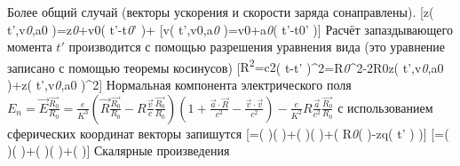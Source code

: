\documentclass[11pt]{article}
\begin{document}
Более общий случай (векторы ускорения и скорости заряда сонаправлены).
{[}z\left( t',{{v}\emph{{0}},{{a}}{0}}
\right)={{z}\emph{{0}}+{{v}}{0}}\left(
t'-{{t}\emph{{0}}'
\right)+\frac{{{a}_{0}}{{\left( t'-{{t}_{0}}' \right)}^{2}}}{2}{]}
{[}v\left( t',{{v}}{0}},{{a}\emph{{0}}
\right)={{v}}{0}}+{{a}\emph{{0}}\left( t'-{{t}}{0}}'
\right){]} Расчёт запаздывающего момента \(t'\) производится с помощью
разрешения уравнения вида (это уравнение записано с помощью теоремы
косинусов) {[}{{R}\textsuperscript{{2}}={{c}}{2}}{{\left(
t-t'
\right)}^{2}}={{R}\emph{{0}}^{2}-2{{R}}{0}}z\left(
t',{{v}\emph{{0}},{{a}}{0}} \right)\cos \theta +z{{\left(
t',{{v}\emph{{0}},{{a}}{0}} \right)}^{2}}{]}
Нормальная компонента электрического поля
\({{E}_{n}}=\overrightarrow{E}\frac{\overrightarrow{{{R}_{0}}}}{{{R}_{0}}}=\frac{e}{{{K}^{3}}}\left( \overrightarrow{R}\frac{\overrightarrow{{{R}_{0}}}}{{{R}_{0}}}-R\frac{\overrightarrow{v}}{c}\frac{\overrightarrow{{{R}_{0}}}}{{{R}_{0}}} \right)\left( 1+\frac{\overrightarrow{a}\cdot \overrightarrow{R}}{{{c}^{2}}}-\frac{\overrightarrow{v}\cdot \overrightarrow{v}}{{{c}^{2}}} \right)-\frac{e}{{{K}^{2}}}R\frac{\overrightarrow{a}}{{{c}^{2}}}\frac{\overrightarrow{{{R}_{0}}}}{{{R}_{0}}}\)
с использованием сферических координат векторы запишутся
{[}=\sin \left(
\theta  \right)\cos \left(
\varphi  \right)+\sin \left(
\theta  \right)\sin \left( \varphi  \right)+\left(
{{R}\emph{{0}}\cos \left( \theta  \right)-{{z}}{q}}\left( t'
\right) \right){]}
{[}=\sin \left(
\theta  \right)\cos \left(
\varphi  \right)+\sin \left(
\theta  \right)\sin \left(
\varphi  \right)+\cos \left(
\theta  \right){]} Скалярные произведения
\end{document}
